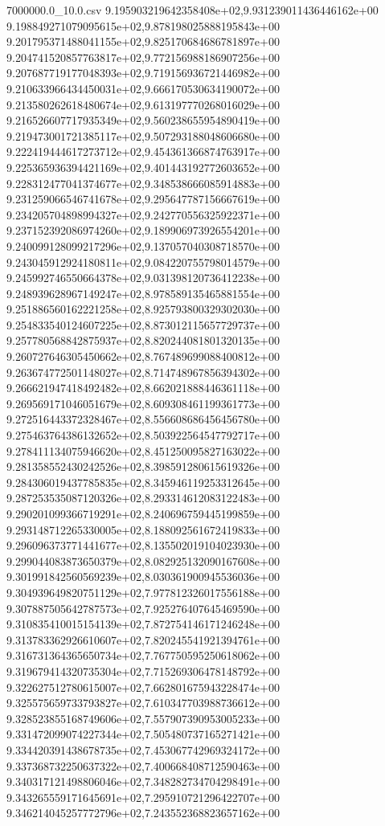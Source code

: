 \begin{filecontents*}{7000000.0_10.0.csv}
9.195903219642358408e+02,9.931239011436446162e+00
9.198849271079095615e+02,9.878198025888195843e+00
9.201795371488041155e+02,9.825170684686781897e+00
9.204741520857763817e+02,9.772156988186907256e+00
9.207687719177048393e+02,9.719156936721446982e+00
9.210633966434450031e+02,9.666170530634190072e+00
9.213580262618480674e+02,9.613197770268016029e+00
9.216526607717935349e+02,9.560238655954890419e+00
9.219473001721385117e+02,9.507293188048606680e+00
9.222419444617273712e+02,9.454361366874763917e+00
9.225365936394421169e+02,9.401443192772603652e+00
9.228312477041374677e+02,9.348538666085914883e+00
9.231259066546741678e+02,9.295647787156667619e+00
9.234205704898994327e+02,9.242770556325922371e+00
9.237152392086974260e+02,9.189906973926554201e+00
9.240099128099217296e+02,9.137057040308718570e+00
9.243045912924180811e+02,9.084220755798014579e+00
9.245992746550664378e+02,9.031398120736412238e+00
9.248939628967149247e+02,8.978589135465881554e+00
9.251886560162221258e+02,8.925793800329302030e+00
9.254833540124607225e+02,8.873012115657729737e+00
9.257780568842875937e+02,8.820244081801320135e+00
9.260727646305450662e+02,8.767489699088400812e+00
9.263674772501148027e+02,8.714748967856394302e+00
9.266621947418492482e+02,8.662021888446361118e+00
9.269569171046051679e+02,8.609308461199361773e+00
9.272516443372328467e+02,8.556608686456456780e+00
9.275463764386132652e+02,8.503922564547792717e+00
9.278411134075946620e+02,8.451250095827163022e+00
9.281358552430242526e+02,8.398591280615619326e+00
9.284306019437785835e+02,8.345946119253312645e+00
9.287253535087120326e+02,8.293314612083122483e+00
9.290201099366719291e+02,8.240696759445199859e+00
9.293148712265330005e+02,8.188092561672419833e+00
9.296096373771441677e+02,8.135502019104023930e+00
9.299044083873650379e+02,8.082925132090167608e+00
9.301991842560569239e+02,8.030361900945536036e+00
9.304939649820751129e+02,7.977812326017556188e+00
9.307887505642787573e+02,7.925276407645469590e+00
9.310835410015154139e+02,7.872754146171246248e+00
9.313783362926610607e+02,7.820245541921394761e+00
9.316731364365650734e+02,7.767750595250618062e+00
9.319679414320735304e+02,7.715269306478148792e+00
9.322627512780615007e+02,7.662801675943228474e+00
9.325575659733793827e+02,7.610347703988736612e+00
9.328523855168749606e+02,7.557907390953005233e+00
9.331472099074227344e+02,7.505480737165271421e+00
9.334420391438678735e+02,7.453067742969324172e+00
9.337368732250637322e+02,7.400668408712590463e+00
9.340317121498806046e+02,7.348282734704298491e+00
9.343265559171645691e+02,7.295910721296422707e+00
9.346214045257772796e+02,7.243552368823657162e+00

\end{filecontents*}
